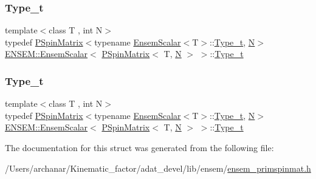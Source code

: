 \subsubsection{\texorpdfstring{Type\_t}{Type\_t}\hspace{0.1cm}{\footnotesize\ttfamily [1/2]}}
{\footnotesize\ttfamily template$<$class T , int N$>$ \\
typedef \mbox{\hyperlink{classENSEM_1_1PSpinMatrix}{P\+Spin\+Matrix}}$<$typename \mbox{\hyperlink{structENSEM_1_1EnsemScalar}{Ensem\+Scalar}}$<$T$>$\+::\mbox{\hyperlink{structENSEM_1_1EnsemScalar_3_01PSpinMatrix_3_01T_00_01N_01_4_01_4_a45d77e25a68437833d711402b4dfd773}{Type\+\_\+t}}, \mbox{\hyperlink{operator__name__util_8cc_a7722c8ecbb62d99aee7ce68b1752f337}{N}}$>$ \mbox{\hyperlink{structENSEM_1_1EnsemScalar}{E\+N\+S\+E\+M\+::\+Ensem\+Scalar}}$<$ \mbox{\hyperlink{classENSEM_1_1PSpinMatrix}{P\+Spin\+Matrix}}$<$ T, \mbox{\hyperlink{operator__name__util_8cc_a7722c8ecbb62d99aee7ce68b1752f337}{N}} $>$ $>$\+::\mbox{\hyperlink{structENSEM_1_1EnsemScalar_3_01PSpinMatrix_3_01T_00_01N_01_4_01_4_a45d77e25a68437833d711402b4dfd773}{Type\+\_\+t}}}

\mbox{\label{structENSEM_1_1EnsemScalar_3_01PSpinMatrix_3_01T_00_01N_01_4_01_4_a45d77e25a68437833d711402b4dfd773}} 
\subsubsection{\texorpdfstring{Type\_t}{Type\_t}\hspace{0.1cm}{\footnotesize\ttfamily [2/2]}}
{\footnotesize\ttfamily template$<$class T , int N$>$ \\
typedef \mbox{\hyperlink{classENSEM_1_1PSpinMatrix}{P\+Spin\+Matrix}}$<$typename \mbox{\hyperlink{structENSEM_1_1EnsemScalar}{Ensem\+Scalar}}$<$T$>$\+::\mbox{\hyperlink{structENSEM_1_1EnsemScalar_3_01PSpinMatrix_3_01T_00_01N_01_4_01_4_a45d77e25a68437833d711402b4dfd773}{Type\+\_\+t}}, \mbox{\hyperlink{operator__name__util_8cc_a7722c8ecbb62d99aee7ce68b1752f337}{N}}$>$ \mbox{\hyperlink{structENSEM_1_1EnsemScalar}{E\+N\+S\+E\+M\+::\+Ensem\+Scalar}}$<$ \mbox{\hyperlink{classENSEM_1_1PSpinMatrix}{P\+Spin\+Matrix}}$<$ T, \mbox{\hyperlink{operator__name__util_8cc_a7722c8ecbb62d99aee7ce68b1752f337}{N}} $>$ $>$\+::\mbox{\hyperlink{structENSEM_1_1EnsemScalar_3_01PSpinMatrix_3_01T_00_01N_01_4_01_4_a45d77e25a68437833d711402b4dfd773}{Type\+\_\+t}}}



The documentation for this struct was generated from the following file\+:\begin{DoxyCompactItemize}
\item 
/\+Users/archanar/\+Kinematic\+\_\+factor/adat\+\_\+devel/lib/ensem/\mbox{\hyperlink{lib_2ensem_2ensem__primspinmat_8h}{ensem\+\_\+primspinmat.\+h}}\end{DoxyCompactItemize}

